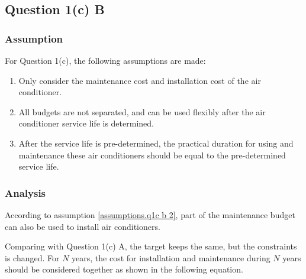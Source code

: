 \documentclass[titlepage,a4paper]{article}
\begin{document}


    \subsection{Question 1(c) B}
    
        \subsubsection{Assumption}

        For Question 1(c), the following assumptions are made:

            \begin{enumerate}
                \item Only consider the maintenance cost and installation cost of the air conditioner.
                \item \label{assumptions.q1c b 2} All budgets are not separated, and can be used flexibly after the air conditioner service life is determined.
                \item After the service life is pre-determined, the practical duration for using and maintenance these air conditioners should  be equal to the pre-determined service life.
            \end{enumerate}

        \subsubsection{Analysis} \label{analysis.q1c b}
        
        According to assumption \ref{assumptions.q1c b 2}, part of the maintenance budget can also be used to install air conditioners. 

        Comparing with Question 1(c) A, the target keeps the same, but the constraints is changed. For $N$ years, the cost for installation and maintenance during $N$ years should be considered together as shown in the following equation.
\end{document}
